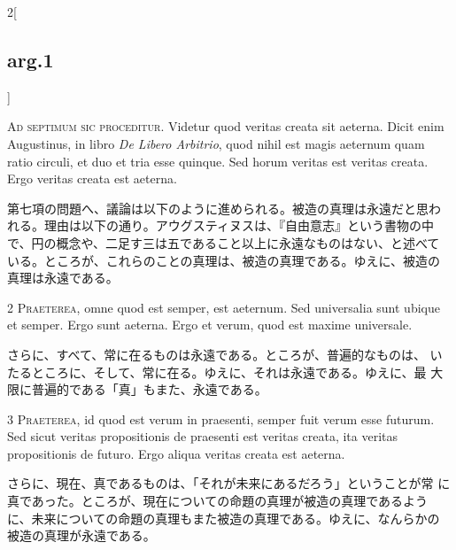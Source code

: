 \documentclass[paper=a4paper,fontsize=10pt,jafontsize=9pt,titlepage]{jlreq}
\begin{document}
\begin{paracol}{2}[\subsection{arg.1}]


{\huge A}{\scshape d septimum sic proceditur}. Videtur quod veritas
creata sit aeterna. Dicit enim Augustinus, in libro {\itshape De
Libero Arbitrio}, quod nihil est magis aeternum quam ratio circuli, et
duo et tria esse quinque. Sed horum veritas est veritas creata. Ergo
veritas creata est aeterna.

\switchcolumn

第七項の問題へ、議論は以下のように進められる。被造の真理は永遠だと思わ
れる。理由は以下の通り。アウグスティヌスは、『自由意志』という書物の中
で、円の概念や、二足す三は五であること以上に永遠なものはない、と述べて
いる。ところが、これらのことの真理は、被造の真理である。ゆえに、被造の
真理は永遠である。



{\scshape 2 Praeterea}, omne quod est semper, est aeternum. Sed
 universalia sunt ubique et semper. Ergo sunt aeterna. Ergo et verum,
 quod est maxime universale.

\switchcolumn

さらに、すべて、常に在るものは永遠である。ところが、普遍的なものは、
いたるところに、そして、常に在る。ゆえに、それは永遠である。ゆえに、最
大限に普遍的である「真」もまた、永遠である。



{\scshape 3 Praeterea}, id quod est verum in praesenti, semper fuit
verum esse futurum. Sed sicut veritas propositionis de praesenti est
veritas creata, ita veritas propositionis de futuro. Ergo aliqua
veritas creata est aeterna.

\switchcolumn

さらに、現在、真であるものは、「それが未来にあるだろう」ということが常
に真であった。ところが、現在についての命題の真理が被造の真理であるよう
に、未来についての命題の真理もまた被造の真理である。ゆえに、なんらかの
被造の真理が永遠である。




\end{paracol}
\end{document}
